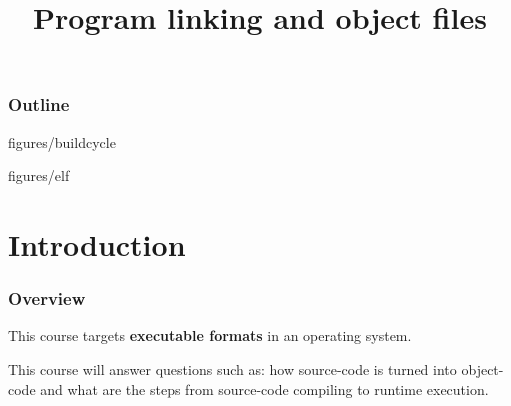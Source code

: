 %
%
%
%
%
%

%
%

%
%

\def\path{../..}

%
%



%
%

\title{Program linking and object files}

%
%



%
%

\begin{frame}
  \titlepage
\end{frame}

%
%

\begin{frame}
  \frametitle{Outline}

  \tableofcontents
\end{frame}

%
%

                {figures/buildcycle}

                {figures/elf}

%
%

%
%

\section{Introduction}


\begin{frame}
  \frametitle{Overview}

  This course targets \textbf{executable formats} in an operating system.

  \-

  This course will answer questions such as: how source-code is turned into
  object-code and what are the steps from source-code compiling to 
  runtime execution.
 
\end{frame}


